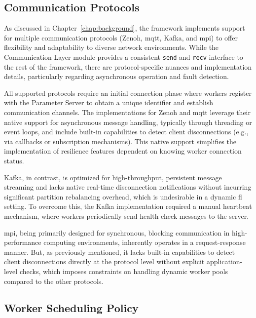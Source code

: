\subsection{Communication Protocols}
\label{sec:comm-protocols-caveats}

As discussed in Chapter~\ref{chap:background}, the framework implements support for multiple communication protocols (Zenoh, \ac{mqtt}, Kafka, and \ac{mpi}) to offer flexibility and adaptability to diverse network environments. While the Communication Layer module provides a consistent \texttt{send} and \texttt{recv} interface to the rest of the framework, there are protocol-specific nuances and implementation details, particularly regarding asynchronous operation and fault detection.

All supported protocols require an initial connection phase where workers register with the Parameter Server to obtain a unique identifier and establish communication channels. The implementations for Zenoh and  \ac{mqtt} leverage their native support for asynchronous message handling, typically through threading or event loops, and include built-in capabilities to detect client disconnections (e.g., via callbacks or subscription mechanisms). This native support simplifies the implementation of resilience features dependent on knowing worker connection status.

Kafka, in contrast, is optimized for high-throughput, persistent message streaming and lacks native real-time disconnection notifications without incurring significant partition rebalancing overhead, which is undesirable in a dynamic \ac{fl} setting. To overcome this, the Kafka implementation required a manual heartbeat mechanism, where workers periodically send health check messages to the server. 

\ac{mpi}, being primarily designed for synchronous, blocking communication in high-performance computing environments, inherently operates in a request-response manner. But, as previously mentioned, it lacks built-in capabilities to detect client disconnections directly at the protocol level without explicit application-level checks, which imposes constraints on handling dynamic worker pools compared to the other protocols.

\subsection{Worker Scheduling Policy}
\label{sec:worker-scheduling-policy}

